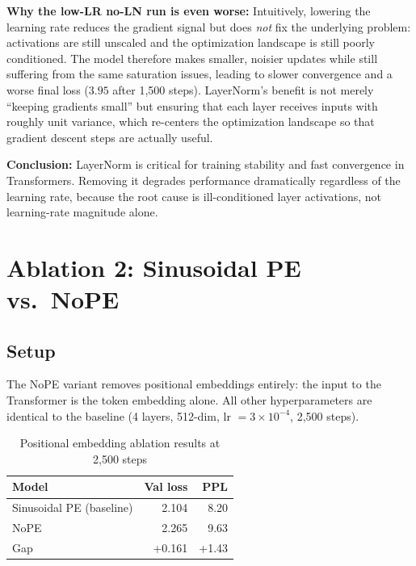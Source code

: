 \documentclass{article}
\begin{document}
\textbf{Why the low-LR no-LN run is even worse:}
Intuitively, lowering the learning rate reduces the gradient signal but does
\emph{not} fix the underlying problem: activations are still unscaled and the
optimization landscape is still poorly conditioned.  The model therefore makes
smaller, noisier updates while still suffering from the same saturation issues,
leading to slower convergence and a worse final loss ($3.95$ after 1{,}500 steps).
LayerNorm's benefit is not merely ``keeping gradients small'' but ensuring that
each layer receives inputs with roughly unit variance, which re-centers the
optimization landscape so that gradient descent steps are actually useful.

\textbf{Conclusion:}  LayerNorm is critical for training stability and fast
convergence in Transformers.  Removing it degrades performance dramatically
regardless of the learning rate, because the root cause is ill-conditioned
layer activations, not learning-rate magnitude alone.

\section{Ablation 2: Sinusoidal PE vs.\ NoPE}

\subsection{Setup}

The NoPE variant removes positional embeddings entirely: the input to the
Transformer is the token embedding alone.  All other hyperparameters are
identical to the baseline (4 layers, 512-dim, lr $= 3\times10^{-4}$,
2{,}500 steps).

\begin{table}[h]
\centering
\caption{Positional embedding ablation results at 2{,}500 steps}
\label{tab:pe}
\begin{tabular}{lrr}
\toprule
Model & Val loss & PPL \\
\midrule
Sinusoidal PE (baseline) & 2.104 & 8.20 \\
NoPE & 2.265 & 9.63 \\
\midrule
Gap & +0.161 & +1.43 \\
\bottomrule
\end{tabular}
\end{table}
\end{document}
